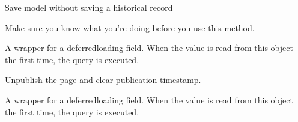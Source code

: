 \documentclass[letterpaper,10pt,english]{sphinxmanual}
\begin{document}
\begin{fulllineitems}
\begin{fulllineitems}
\end{fulllineitems}


\begin{fulllineitems}
\label{\detokenize{pages_app.models:pages_app.models.Page.save_without_historical_record}}
\pysigstartsignatures
\pysiglinewithargsret
{}
{\sphinxparamcomma {}}
{}
\pysigstopsignatures
\sphinxAtStartPar
Save model without saving a historical record

\sphinxAtStartPar
Make sure you know what you’re doing before you use this method.

\end{fulllineitems}


\begin{fulllineitems}
\label{\detokenize{pages_app.models:id39}}
\pysigstartsignatures
\pysigline
{}
\pysigstopsignatures
\sphinxAtStartPar
A wrapper for a deferred\sphinxhyphen{}loading field. When the value is read from this
object the first time, the query is executed.

\end{fulllineitems}


\begin{fulllineitems}
\label{\detokenize{pages_app.models:pages_app.models.Page.unpublish}}
\pysigstartsignatures
\pysiglinewithargsret
{}
{}
{}
\pysigstopsignatures
\sphinxAtStartPar
Unpublish the page and clear publication timestamp.

\end{fulllineitems}


\begin{fulllineitems}
\label{\detokenize{pages_app.models:pages_app.models.Page.updated_at}}
\pysigstartsignatures
\pysigline
{}
\pysigstopsignatures
\sphinxAtStartPar
A wrapper for a deferred\sphinxhyphen{}loading field. When the value is read from this
object the first time, the query is executed.


\end{fulllineitems}
\end{fulllineitems}
\end{document}
